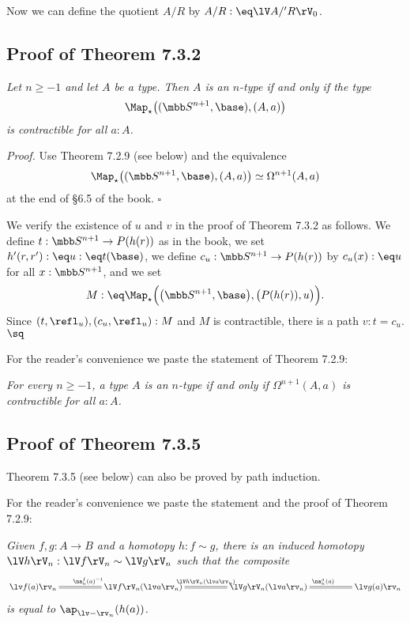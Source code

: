 \documentclass[12pt]{article}
\begin{document}
Now we can define the quotient $A/R$ by $A/R:\eq\lV A/'R\rV_0$. 


\subsection{Proof of Theorem 7.3.2}

 \emph{Let $n\ge-1$ and let $A$ be a type. Then $A$ is an $n$-type if and only if the type 
$$
\Map_\star\big((\mbb S^{n+1},\base),(A,a)\big)
$$ 
is contractible for all $a:A$.}

\nn\emph{Proof.} Use Theorem 7.2.9 (see below) and the equivalence 
$$
\Map_\star\big((\mbb S^{n+1},\base),(A,a)\big)\simeq\Omega^{n+1}(A,a)
$$ 
at the end of \S6.5 of the book. $\square$

We verify the existence of $u$ and $v$ in the proof of Theorem 7.3.2 as follows. We define $t:\mbb S^{n+1}\to P(h(r))$ as in the book, we set $h'(r,r'):\eq u:\eq t(\base)$, we define $c_u:\mbb S^{n+1}\to P(h(r))$ by $c_u(x):\eq u$ for all $x:\mbb S^{n+1}$, and we set
$$
M:\eq\Map_\star\Big(\big(\mbb S^{n+1},\base\big),\big(P(h(r)),u\big)\Big).
$$ 
Since $(t,\refl_u),(c_u,\refl_u):M$ and $M$ is contractible, there is a path $v:t=c_u$. $\sq$

For the reader's convenience we paste the statement of Theorem 7.2.9:

\nn{} \emph{For every $n\ge-1$, a type $A$ is an $n$-type if and only if $\Omega^{n+1}(A,a)$ is contractible for all $a:A$.}


\subsection{Proof of Theorem 7.3.5}

Theorem 7.3.5 (see below) can also be proved by path induction.

For the reader's convenience we paste the statement and the proof of Theorem 7.2.9:

\nn{} \emph{Given $f,g:A\to B$ and a homotopy $h:f\sim g$, there is an induced homotopy $\lV h\rV_n:\lV f\rV_n\sim\lV g\rV_n$ such that the composite
\begin{equation}\label{735}
\xymatrix@C=50pt{
\lv f(a)\rv_n\ar@{=}[r]^{\na^f_n(a)^{-1}}&
\lV f\rV_n(\lv a\rv_n)\ar@{=}[r]^{\lV h\rV_n(\lv a\rv_n)}&
\lV g\rV_n(\lv a\rv_n)\ar@{=}[r]^{\na^g_n(a)}&
\lv g(a)\rv_n}
\end{equation}
is equal to $\ap_{\lv-\rv_n}(h(a))$.}
\end{document}
